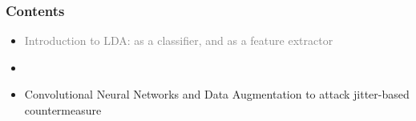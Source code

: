 \begin{frame}
\frametitle{Contents}
\begin{itemize}
\item \textcolor{grey}{Introduction to LDA: as a classifier, and as a feature extractor}
\item {}
\item Convolutional Neural Networks and Data Augmentation to attack jitter-based countermeasure
\end{itemize}
\end{frame}

%
%
%
%
%
%
%
%
%
